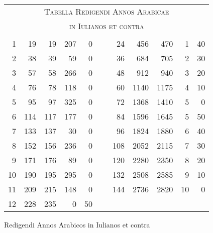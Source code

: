 %
\begin{tabnums} %
\normalsize
\centering
\setlength{\tabcolsep}{1.0ex}
%
\newcommand{\cwd}{3.2em}
\newcommand{\da}{{\scriptsize †}}
\newcommand{\db}{{\scriptsize ‡}}
\newcommand{\ang}{90}
\newcommand{\hsa}[1]{\footnotesize{#1}}
\newcommand{\hsb}[1]{\tiny{#1}}
\newcommand{\hdrB}{%
  \ch{888}{\hsb{Ennea\-deca\-e\-te\-ri\-des}} &
  \ch{8888}{\hsb{Anni Iuliani}}&
  \ch{8888}{\hsb{Anni Arabici}} &
  \hsb{\ch{Dies}{Dies}} &
  \hsb{\ch{Scrupux}{Scrupu\-li~diei}} 
}
%
\newcommand{\hdrs}{%
 \hdrB & & \hdrB \\
 \cmidrule(l){1-5} \cmidrule(l){7-11}
}
%
\begin{tabular}[c]{@{} rrrrr c rrrrr @{}}
\toprule
\multicolumn{11}{c}{\Large\textsc{Tabella Redigendi Annos Arabicae}} \\
\multicolumn{11}{c}{\large\textsc{in Iulianos et contra}} \\
\toprule
\hdrs %
  1 &  19 &  19 & 207 &  0 &~&  24 &  456 &  470 &  1 & 40\\
  2 &  38 &  39 &  59 &  0 &~&  36 &  684 &  705 &  2 & 30\\
  3 &  57 &  58 & 266 &  0 &~&  48 &  912 &  940 &  3 & 20\\
  4 &  76 &  78 & 118 &  0 &~&  60 & 1140 & 1175 &  4 & 10\\
  5 &  95 &  97 & 325 &  0 &~&  72 & 1368 & 1410 &  5 &  0\\
  6 & 114 & 117 & 177 &  0 &~&  84 & 1596 & 1645 &  5 & 50\\
  7 & 133 & 137 &  30 &  0 &~&  96 & 1824 & 1880 &  6 & 40\\
  8 & 152 & 156 & 236 &  0 &~& 108 & 2052 & 2115 &  7 & 30\\
  9 & 171 & 176 &  89 &  0 &~& 120 & 2280 & 2350 &  8 & 20\\
 10 & 190 & 195 & 295 &  0 &~& 132 & 2508 & 2585 &  9 & 10\\
 11 & 209 & 215 & 148 &  0 &~& 144 & 2736 & 2820 & 10 &  0\\
 12 & 228 & 235 &   0 & 50 &~&     &    &    &    &  \\
\bottomrule
\end{tabular}
\caption{Redigendi Annos Arabicos in Iulianos et contra}
\label{tab:p141a}
\end{tabnums}
